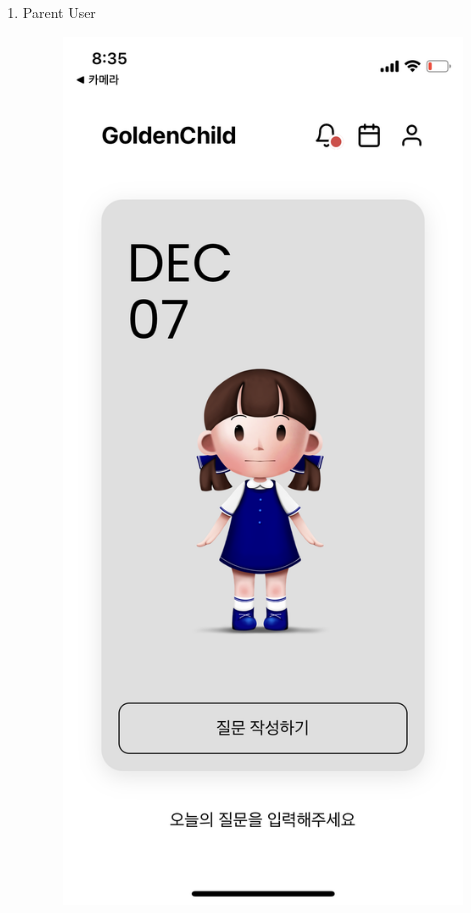 \documentclass[conference]{IEEEtran}
\begin{document}
\begin{enumerate}
    \item Parent User
    \begin{enumerate}
        \begin{figure}[H]
        \centering
        \includegraphics[scale=0.1]{UseCases/4.pmain.png}

\end{figure}
\end{enumerate}
\end{enumerate}
\end{document}
